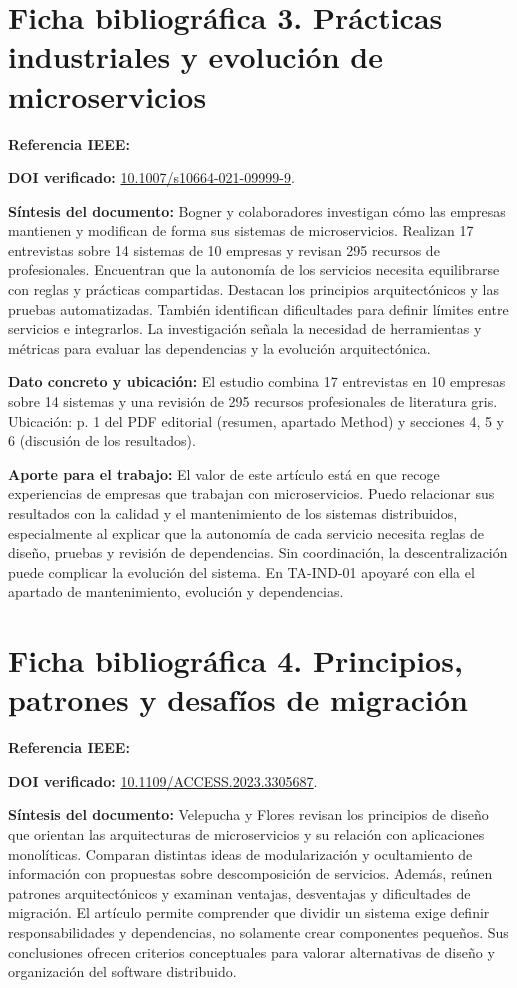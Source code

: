 \documentclass[12pt,a4paper]{article}
\newcommand{\dato}[1]{\textbf{Dato concreto y ubicación:} #1}
\newcommand{\nota}[1]{\textbf{Aporte para el trabajo:} #1}
\newcommand{\resumen}[1]{\textbf{Síntesis del documento:} #1}
\begin{document}
	\section*{Ficha bibliográfica 3. Prácticas industriales y evolución de microservicios}
	\textbf{Referencia IEEE:} 
	
	\textbf{DOI verificado:} \href{https://doi.org/10.1007/s10664-021-09999-9}{10.1007/s10664-021-09999-9}.\par
	
	\resumen{Bogner y colaboradores investigan cómo las empresas mantienen y modifican de forma sus sistemas de microservicios. Realizan 17 entrevistas sobre 14 sistemas de 10 empresas y revisan 295 recursos de profesionales. Encuentran que la autonomía de los servicios necesita equilibrarse con reglas y prácticas compartidas. Destacan los principios arquitectónicos y las pruebas automatizadas. También identifican dificultades para definir límites entre servicios e integrarlos. La investigación señala la necesidad de herramientas y métricas para evaluar las dependencias y la evolución arquitectónica.}
	
	\dato{El estudio combina 17 entrevistas en 10 empresas sobre 14 sistemas y una revisión de 295 recursos profesionales de literatura gris. Ubicación: p. 1 del PDF editorial (resumen, apartado Method) y secciones 4, 5 y 6 (discusión de los resultados).}
	
	\nota{El valor de este artículo está en que recoge experiencias de empresas que trabajan con microservicios. Puedo relacionar sus resultados con la calidad y el mantenimiento de los sistemas distribuidos, especialmente al explicar que la autonomía de cada servicio necesita reglas de diseño, pruebas y revisión de dependencias. Sin coordinación, la descentralización puede complicar la evolución del sistema. En TA-IND-01 apoyaré con ella el apartado de mantenimiento, evolución y dependencias.}
	
	\section*{Ficha bibliográfica 4. Principios, patrones y desafíos de migración}
	\textbf{Referencia IEEE:} 
	
	\textbf{DOI verificado:} \href{https://doi.org/10.1109/ACCESS.2023.3305687}{10.1109/ACCESS.2023.3305687}.\par
	
	\resumen{Velepucha y Flores revisan los principios de diseño que orientan las arquitecturas de microservicios y su relación con aplicaciones monolíticas. Comparan distintas ideas de modularización y ocultamiento de información con propuestas sobre descomposición de servicios. Además, reúnen patrones arquitectónicos y examinan ventajas, desventajas y dificultades de migración. El artículo permite comprender que dividir un sistema exige definir responsabilidades y dependencias, no solamente crear componentes pequeños. Sus conclusiones ofrecen criterios conceptuales para valorar alternativas de diseño y organización del software distribuido.}
	
\end{document}
